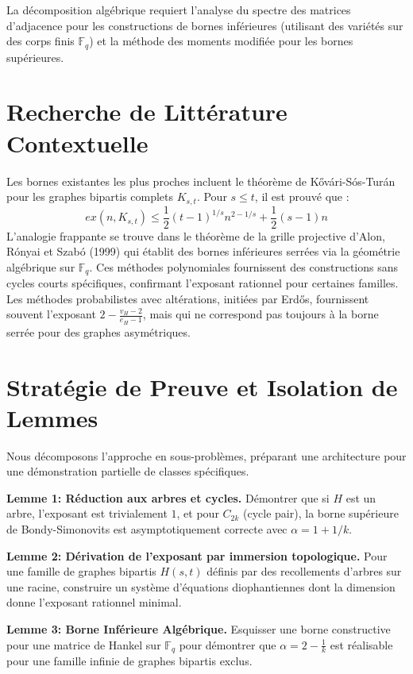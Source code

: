 \documentclass[12pt,a4paper]{article}
\begin{document}
La décomposition algébrique requiert l'analyse du spectre des matrices d'adjacence pour les constructions de bornes inférieures (utilisant des variétés sur des corps finis $\mathbb{F}_q$) et la méthode des moments modifiée pour les bornes supérieures.

\section{Recherche de Littérature Contextuelle}

Les bornes existantes les plus proches incluent le théorème de Kővári-Sós-Turán pour les graphes bipartis complets $K_{s,t}$. Pour $s \leq t$, il est prouvé que :
$$ ex(n, K_{s,t}) \leq \frac{1}{2} (t-1)^{1/s} n^{2 - 1/s} + \frac{1}{2} (s-1) n $$
L'analogie frappante se trouve dans le théorème de la grille projective d'Alon, Rónyai et Szabó (1999) qui établit des bornes inférieures serrées via la géométrie algébrique sur $\mathbb{F}_q$. Ces méthodes polynomiales fournissent des constructions sans cycles courts spécifiques, confirmant l'exposant rationnel pour certaines familles.
Les méthodes probabilistes avec altérations, initiées par Erdős, fournissent souvent l'exposant $2 - \frac{v_H - 2}{e_H - 1}$, mais qui ne correspond pas toujours à la borne serrée pour des graphes asymétriques.

\section{Stratégie de Preuve et Isolation de Lemmes}

Nous décomposons l'approche en sous-problèmes, préparant une architecture pour une démonstration partielle de classes spécifiques.

\textbf{Lemme 1: Réduction aux arbres et cycles.}
Démontrer que si $H$ est un arbre, l'exposant est trivialement $1$, et pour $C_{2k}$ (cycle pair), la borne supérieure de Bondy-Simonovits est asymptotiquement correcte avec $\alpha = 1 + 1/k$.

\textbf{Lemme 2: Dérivation de l'exposant par immersion topologique.}
Pour une famille de graphes bipartis $H(s,t)$ définis par des recollements d'arbres sur une racine, construire un système d'équations diophantiennes dont la dimension donne l'exposant rationnel minimal.

\textbf{Lemme 3: Borne Inférieure Algébrique.}
Esquisser une borne constructive pour une matrice de Hankel sur $\mathbb{F}_q$ pour démontrer que $\alpha = 2 - \frac{1}{k}$ est réalisable pour une famille infinie de graphes bipartis exclus.
\end{document}
